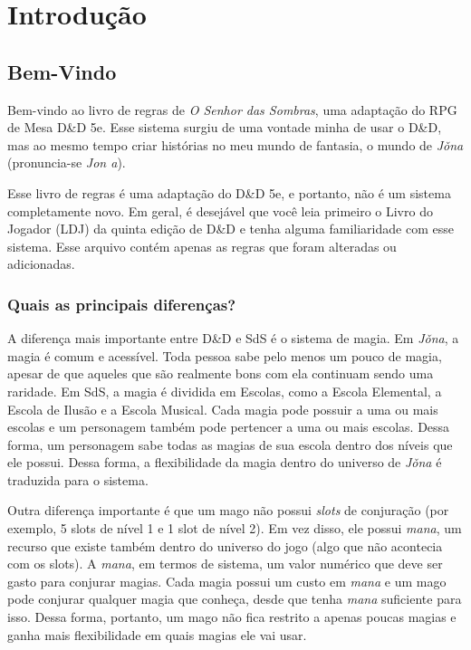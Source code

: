 \chapter{Introdução} %
\label{cha:Introdução}

\section{Bem-Vindo} %
\label{sec:Bem-Vindo}

Bem-vindo ao livro de regras de \textit{O Senhor das Sombras}, uma adaptação do
RPG de Mesa D\&D 5e. Esse sistema surgiu de uma vontade minha de usar o D\&D,
mas ao mesmo tempo criar histórias no meu mundo de fantasia, o mundo de
\textit{Jǒna} (pronuncia-se \textit{Jon a}).

Esse livro de regras é uma adaptação do D\&D 5e, e portanto, não é um sistema
completamente novo. Em geral, é desejável que você leia primeiro o Livro do
Jogador (LDJ) da quinta edição de D\&D e tenha alguma familiaridade com esse
sistema. Esse arquivo contém apenas as regras que foram alteradas ou
adicionadas.

\subsection{Quais as principais diferenças?} %
\label{sub:Quais as principais diferenças?}

A diferença mais importante entre D\&D e SdS é o sistema de magia. Em
\textit{Jǒna}, a magia é comum e acessível. Toda pessoa sabe pelo menos um pouco
de magia, apesar de que aqueles que são realmente bons com ela continuam sendo
uma raridade. Em SdS, a magia é dividida em Escolas, como a Escola Elemental, a
Escola de Ilusão e a Escola Musical. Cada magia pode possuir a uma ou mais
escolas e um personagem também pode pertencer a uma ou mais escolas. Dessa
forma, um personagem sabe todas as magias de sua escola dentro dos níveis que
ele possui. Dessa forma, a flexibilidade da magia dentro do universo de
\textit{Jǒna} é traduzida para o sistema.

Outra diferença importante é que um mago não possui \textit{slots} de
conjuração (por exemplo, 5 slots de nível 1 e 1 slot de nível 2). Em vez disso,
ele possui \textit{mana}, um recurso que existe também dentro do universo do
jogo (algo que não acontecia com os slots). A \textit{mana}, em termos de
sistema, um valor numérico que deve ser gasto para conjurar magias. Cada magia
possui um custo em \textit{mana} e um mago pode conjurar qualquer magia que
conheça, desde que tenha \textit{mana} suficiente para isso. Dessa forma,
portanto, um mago não fica restrito a apenas poucas magias e ganha mais
flexibilidade em quais magias ele vai usar.

